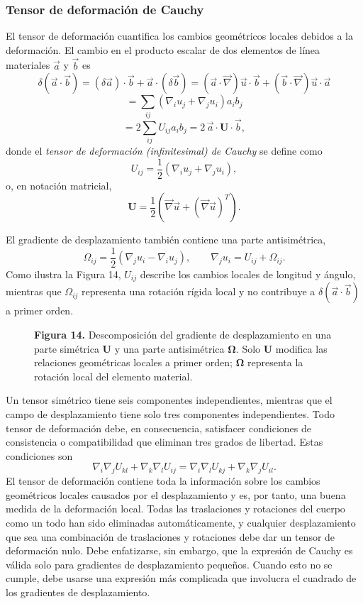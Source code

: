 \subsubsection{Tensor de deformación de Cauchy}

El tensor de deformación cuantifica los cambios geométricos locales debidos a la deformación. El cambio en el producto escalar de dos elementos de línea materiales $\vec{a}$ y $\vec{b}$ es
\[ \delta(\vec{a}\cdot\vec{b}) = (\delta\vec{a})\cdot\vec{b} + \vec{a}\cdot(\delta\vec{b}) = (\vec{a}\cdot\vec{\nabla})\vec{u}\cdot\vec{b} + (\vec{b}\cdot\vec{\nabla})\vec{u}\cdot\vec{a} \]
\[ = \sum_{ij}\left(\nabla_i u_j + \nabla_j u_i\right)a_i b_j \]
\[ = 2\sum_{ij} U_{ij} a_i b_j = 2\,\vec{a}\cdot\mathbf{U}\cdot\vec{b}, \]
donde el \emph{tensor de deformación (infinitesimal) de Cauchy} se define como
\[ U_{ij} = \frac{1}{2}\left(\nabla_i u_j + \nabla_j u_i\right), \]
o, en notación matricial,
\[ \mathbf{U} = \frac{1}{2}\left(\vec{\nabla}\vec{u} + (\vec{\nabla}\vec{u})^{T}\right). \]

El gradiente de desplazamiento también contiene una parte antisimétrica,
\[
\Omega_{ij}=\frac{1}{2}\left(\nabla_j u_i-\nabla_i u_j\right),
\qquad
\nabla_j u_i=U_{ij}+\Omega_{ij}.
\]
Como ilustra la Figura 14, $U_{ij}$ describe los cambios locales de longitud y ángulo, mientras que $\Omega_{ij}$ representa una rotación rígida local y no contribuye a $\delta(\vec a\cdot\vec b)$ a primer orden.

\begin{figure}[H]
\centering

\par\medskip
\textbf{Figura 14.} Descomposición del gradiente de desplazamiento en una parte simétrica $\mathbf{U}$ y una parte antisimétrica $\boldsymbol{\Omega}$. Solo $\mathbf{U}$ modifica las relaciones geométricas locales a primer orden; $\boldsymbol{\Omega}$ representa la rotación local del elemento material.
\end{figure}

Un tensor simétrico tiene seis componentes independientes, mientras que el campo de desplazamiento tiene solo tres componentes independientes. Todo tensor de deformación debe, en consecuencia, satisfacer condiciones de consistencia o compatibilidad que eliminan tres grados de libertad. Estas condiciones son
\[ \nabla_i\nabla_j U_{kl} + \nabla_k\nabla_l U_{ij} = \nabla_i\nabla_l U_{kj} + \nabla_k\nabla_j U_{il}. \]
El tensor de deformación contiene toda la información sobre los cambios geométricos locales causados por el desplazamiento y es, por tanto, una buena medida de la deformación local. Todas las traslaciones y rotaciones del cuerpo como un todo han sido eliminadas automáticamente, y cualquier desplazamiento que sea una combinación de traslaciones y rotaciones debe dar un tensor de deformación nulo. Debe enfatizarse, sin embargo, que la expresión de Cauchy es válida solo para gradientes de desplazamiento pequeños. Cuando esto no se cumple, debe usarse una expresión más complicada que involucra el cuadrado de los gradientes de desplazamiento.

